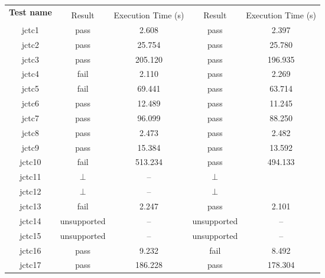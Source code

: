 \begin{figure}[t]
\begin{center}
  \begin{tabularx}{0.9\textwidth}{c||c|c|c|c}
    \multirow{2}{*}{\bf Test name} & \multicolumn{2}{c|}{\PwT{}} & \multicolumn{2}{c}{\PwTc{}} \\
    \cline{2-5}
                                   & Result & Execution Time (s)  & Result & Execution Time (s)  \\
    \cline{1-5}
    jctc1                          & pass   & 2.608               & pass   & 2.397 \\
    jctc2                          & pass   & 25.754              & pass   & 25.780 \\
    jctc3                          & pass   & 205.120             & pass   & 196.935 \\
    jctc4                          & fail   & 2.110               & pass   & 2.269 \\
    jctc5                          & fail   & 69.441              & pass   & 63.714 \\
    jctc6                          & pass   & 12.489              & pass   & 11.245 \\
    jctc7                          & pass   & 96.099              & pass   & 88.250 \\
    jctc8                          & pass   & 2.473               & pass   & 2.482 \\
    jctc9                          & pass   & 15.384              & pass   & 13.592 \\
    jctc10                         & fail   & 513.234             & pass   & 494.133 \\
    jctc11                         & $\bot$ & --                  & $\bot$ & \\
    jctc12                         & $\bot$ & --                  & $\bot$ & \\
    jctc13                         & fail   & 2.247               & pass   & 2.101 \\
    jctc14                         & unsupported   & --           & unsupported   & -- \\
    jctc15                         & unsupported   & --           & unsupported   & -- \\
    jctc16                         & pass   & 9.232               & fail   & 8.492 \\
    jctc17                         & pass   & 186.228             & pass   & 178.304 \\

\end{tabularx}
\end{center}
\end{figure}
